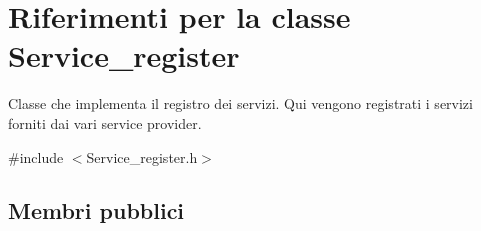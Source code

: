 \hypertarget{class_service__register}{\section{Riferimenti per la classe Service\-\_\-register}
\label{class_service__register}
}


Classe che implementa il registro dei servizi. Qui vengono registrati i servizi forniti dai vari service provider.  




{\ttfamily \#include $<$Service\-\_\-register.\-h$>$}

\subsection*{Membri pubblici}
